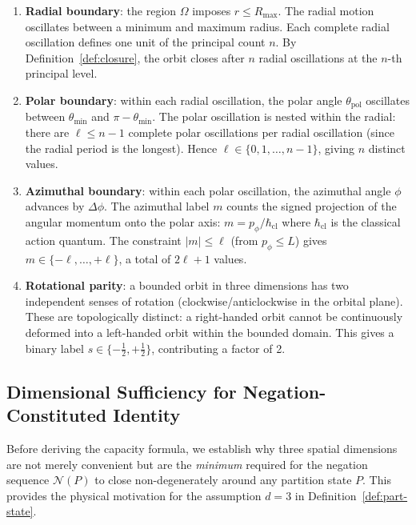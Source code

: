 \documentclass[twocolumn,10pt,a4paper]{article}
\theoremstyle{thmstyle}
\theoremstyle{definition}
\theoremstyle{remark}
\begin{document}
\begin{enumerate}[leftmargin=1.5em,itemsep=0.2em]
\item \textbf{Radial boundary}: the region $\Omega$ imposes $r \leq R_{\max}$. The radial motion oscillates between a minimum and maximum radius. Each complete radial oscillation defines one unit of the principal count $n$. By Definition~\ref{def:closure}, the orbit closes after $n$ radial oscillations at the $n$-th principal level.

\item \textbf{Polar boundary}: within each radial oscillation, the polar angle $\theta_\text{pol}$ oscillates between $\theta_{\min}$ and $\pi - \theta_{\min}$. The polar oscillation is nested within the radial: there are $\ell \leq n-1$ complete polar oscillations per radial oscillation (since the radial period is the longest). Hence $\ell \in \{0, 1, \ldots, n-1\}$, giving $n$ distinct values.

\item \textbf{Azimuthal boundary}: within each polar oscillation, the azimuthal angle $\phi$ advances by $\Delta\phi$. The azimuthal label $m$ counts the signed projection of the angular momentum onto the polar axis: $m = p_\phi / \hbar_{\mathrm{cl}}$ where $\hbar_{\mathrm{cl}}$ is the classical action quantum. The constraint $|m| \leq \ell$ (from $p_\phi \leq L$) gives $m \in \{-\ell, \ldots, +\ell\}$, a total of $2\ell + 1$ values.

\item \textbf{Rotational parity}: a bounded orbit in three dimensions has two independent senses of rotation (clockwise/anticlockwise in the orbital plane). These are topologically distinct: a right-handed orbit cannot be continuously deformed into a left-handed orbit within the bounded domain. This gives a binary label $s \in \{-\tfrac{1}{2}, +\tfrac{1}{2}\}$, contributing a factor of 2.
\end{enumerate}

\subsection{Dimensional Sufficiency for Negation-Constituted Identity}
\label{sec:dim-sufficiency}

Before deriving the capacity formula, we establish why three spatial dimensions are not merely convenient but are the \emph{minimum} required for the negation sequence $\mathcal{N}(P)$ to close non-degenerately around any partition state $P$. This provides the physical motivation for the assumption $d = 3$ in Definition~\ref{def:part-state}.
\end{document}
